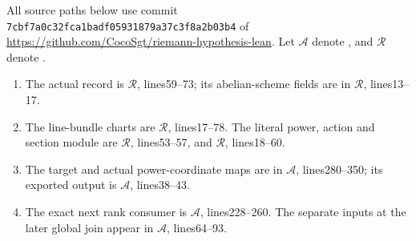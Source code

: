 All source paths below use commit
\nolinkurl{7cbf7a0c32fca1badf05931879a37c3f8a2b03b4} of
\url{https://github.com/CocoSgt/riemann-hypothesis-lean}.
Let $\mathcal A$ denote
,
and $\mathcal R$ denote
.
\begin{enumerate}
 \item The actual record is
 $\mathcal R$, lines59--73;
 its abelian-scheme fields are in
 $\mathcal R$,
 lines13--17.
 \item The line-bundle charts are
 $\mathcal R$,
 lines17--78.  The literal power, action and section module are
 $\mathcal R$, lines53--57, and
 $\mathcal R$, lines18--60.
 \item The target and actual power-coordinate maps are in
 $\mathcal A$, lines280--350;
 its exported output is
 $\mathcal A$,
 lines38--43.
 \item The exact next rank consumer is
 $\mathcal A$, lines228--260.
 The separate inputs at the later global join appear in
 $\mathcal A$, lines64--93.
\end{enumerate}
